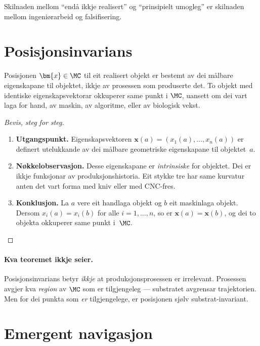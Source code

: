 Skilnaden mellom ``endå ikkje realisert'' og ``prinsipielt
umogleg'' er skilnaden mellom ingeniørarbeid og falsifisering.


\section{Posisjonsinvarians}

\begin{satmark}[Posisjonsinvarians]\label{thm:L.7.2}
Posisjonen $\bm{x} \in \MC$ til eit realisert objekt er bestemt
av dei målbare eigenskapane til objektet, ikkje av prosessen som
produserte det. To objekt med identiske eigenskapsvektorar
okkuperer same punkt i $\MC$, uansett om dei vart laga for hand,
av maskin, av algoritme, eller av biologisk vekst.
\end{satmark}

\begin{proof}[Bevis, steg for steg]
\begin{enumerate}
  \item \textbf{Utgangspunkt.}\;
    Eigenskapsvektoren $\bm{x}(a) = (x_1(a), \ldots, x_n(a))$ er
    definert utelukkande av dei målbare geometriske eigenskapane
    til objektet~$a$.
  \item \textbf{Nøkkelobservasjon.}\;
    Desse eigenskapane er \emph{intrinsiske} for objektet. Dei er
    ikkje funksjonar av produksjonshistoria. Eit stykke tre har
    same kurvatur anten det vart forma med kniv eller med
    CNC-fres.
  \item \textbf{Konklusjon.}\;
    La $a$ vere eit handlaga objekt og $b$ eit maskinlaga objekt.
    Dersom $x_i(a) = x_i(b)$ for alle $i = 1, \ldots, n$, so er
    $\bm{x}(a) = \bm{x}(b)$, og dei to objekta okkuperer same
    punkt i~$\MC$. \qedhere
\end{enumerate}
\end{proof}

\paragraph{Kva teoremet ikkje seier.}
Posisjonsinvarians betyr \emph{ikkje} at produksjonsprosessen er
irrelevant. Prosessen avgjer kva \emph{region} av $\MC$ som er
tilgjengeleg --- substratet avgrensar trajektorien. Men for dei
punkta som \emph{er} tilgjengelege, er posisjonen
sjølv substrat-invariant.


\section{Emergent navigasjon}

